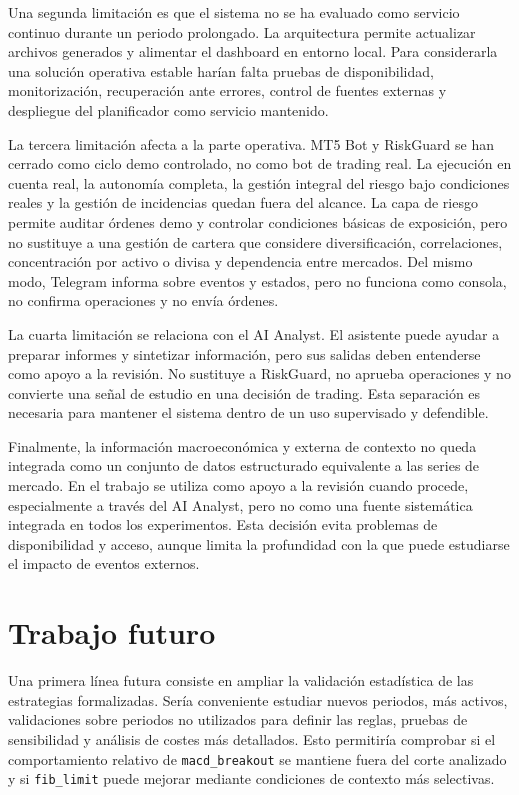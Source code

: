 Una segunda limitaci\'on es que el sistema no se ha evaluado como servicio
continuo durante un periodo prolongado. La arquitectura permite actualizar
archivos generados y alimentar el dashboard en entorno local. Para
considerarla una soluci\'on operativa estable har\'ian falta pruebas de
disponibilidad, monitorizaci\'on, recuperaci\'on ante errores, control de fuentes
externas y despliegue del planificador como servicio mantenido.

La tercera limitaci\'on afecta a la parte operativa. MT5 Bot y RiskGuard se han
cerrado como ciclo demo controlado, no como bot de trading real. La ejecuci\'on en
cuenta real, la autonom\'ia completa, la gesti\'on integral del riesgo bajo
condiciones reales y la gesti\'on de incidencias quedan fuera del alcance. La
capa de riesgo permite auditar \'ordenes demo y controlar condiciones b\'asicas de
exposici\'on, pero no sustituye a una gesti\'on de cartera que considere
diversificaci\'on, correlaciones, concentraci\'on por activo o divisa y dependencia
entre mercados. Del mismo modo, Telegram informa sobre eventos y estados, pero
no funciona como consola, no confirma operaciones y no env\'ia \'ordenes.

La cuarta limitaci\'on se relaciona con el AI Analyst. El asistente puede ayudar a
preparar informes y sintetizar informaci\'on, pero sus salidas deben entenderse
como apoyo a la revisi\'on. No sustituye a RiskGuard, no aprueba operaciones y no
convierte una se\~nal de estudio en una decisi\'on de trading. Esta separaci\'on es
necesaria para mantener el sistema dentro de un uso supervisado y defendible.

Finalmente, la informaci\'on macroecon\'omica y externa de contexto no queda
integrada como un conjunto de datos estructurado equivalente a las series de
mercado. En el trabajo se utiliza como apoyo a la revisi\'on cuando procede,
especialmente a trav\'es del AI Analyst, pero no como una fuente sistem\'atica
integrada en todos los experimentos. Esta decisi\'on evita problemas de
disponibilidad y acceso, aunque limita la profundidad con la que puede
estudiarse el impacto de eventos externos.

\section{Trabajo futuro}

Una primera l\'inea futura consiste en ampliar la validaci\'on estad\'istica de las
estrategias formalizadas. Ser\'ia conveniente estudiar nuevos periodos, m\'as
activos, validaciones sobre periodos no utilizados para definir las reglas,
pruebas de sensibilidad y an\'alisis de costes m\'as detallados. Esto permitir\'ia
comprobar si el comportamiento relativo de \texttt{macd\_breakout} se mantiene
fuera del corte analizado y si \texttt{fib\_limit} puede mejorar mediante
condiciones de contexto m\'as selectivas.

